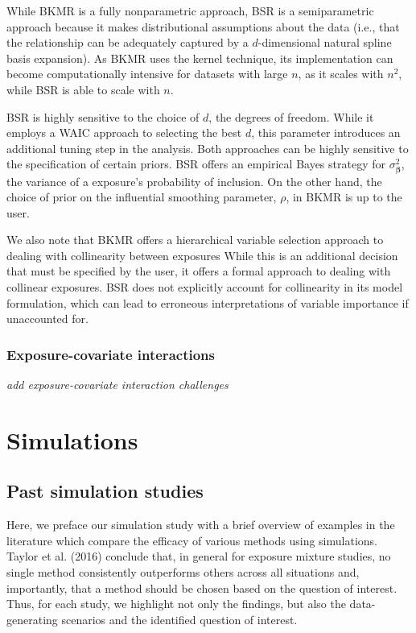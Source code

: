 \documentclass[12pt, twoside]{amherstthesis}
\begin{document}
While BKMR is a fully nonparametric approach, BSR is a semiparametric approach because it makes distributional assumptions about the data (i.e., that the relationship can be adequately captured by a \(d\)-dimensional natural spline basis expansion). As BKMR uses the kernel technique, its implementation can become computationally intensive for datasets with large \(n\), as it scales with \(n^2\), while BSR is able to scale with \(n\).

BSR is highly sensitive to the choice of \(d\), the degrees of freedom. While it employs a WAIC approach to selecting the best \(d\), this parameter introduces an additional tuning step in the analysis. Both approaches can be highly sensitive to the specification of certain priors. BSR offers an empirical Bayes strategy for \(\sigma^2_{\boldsymbol\beta}\), the variance of a exposure's probability of inclusion. On the other hand, the choice of prior on the influential smoothing parameter, \(\rho\), in BKMR is up to the user.

We also note that BKMR offers a hierarchical variable selection approach to dealing with collinearity between exposures While this is an additional decision that must be specified by the user, it offers a formal approach to dealing with collinear exposures. BSR does not explicitly account for collinearity in its model formulation, which can lead to erroneous interpretations of variable importance if unaccounted for.

\hypertarget{exposure-covariate-interactions}{%
\subsection{Exposure-covariate interactions}\label{exposure-covariate-interactions}}

\emph{add exposure-covariate interaction challenges}

\hypertarget{sims}{%
\chapter{Simulations}\label{sims}}

\hypertarget{past-simulation-studies}{%
\section{Past simulation studies}\label{past-simulation-studies}}

Here, we preface our simulation study with a brief overview of examples in the literature which compare the efficacy of various methods using simulations. Taylor et al. (2016) conclude that, in general for exposure mixture studies, no single method consistently outperforms others across all situations and, importantly, that a method should be chosen based on the question of interest. Thus, for each study, we highlight not only the findings, but also the data-generating scenarios and the identified question of interest.
\end{document}
